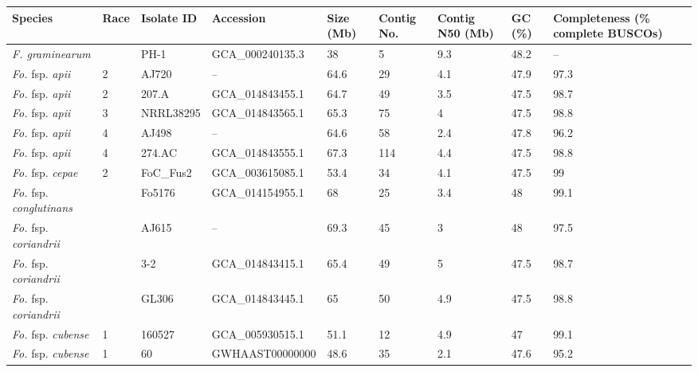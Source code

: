 \begin{ThreePartTable}
\begin{longtable}[c]{@{}C{2.5cm}C{0.8cm}C{2cm}C{2.8cm}C{1cm}C{1cm}C{1.5cm}C{0.7cm}C{2.5cm}@{}}
\label{tab:GenomeDB}\\
\toprule
\textbf{Species} & \textbf{Race} & \textbf{Isolate ID} & \textbf{Accession} & \textbf{Size (Mb)} & \textbf{Contig No.} & \textbf{Contig N50 (Mb)} & \textbf{GC (\%)} & \textbf{Completeness (\% complete BUSCOs)} \\* \midrule
\endhead
%
\bottomrule
\endfoot
%
\endlastfoot
%
\textit{F. graminearum}        &     & PH-1         & GCA\_000240135.3 & 38   & 5     & 9.3  & 48.2 &--    \\
\textit{Fo.} fsp. \textit{apii}         & 2   & AJ720        &--             & 64.6 & 29    & 4.1  & 47.9 & 97.3 \\
\textit{Fo.} fsp. \textit{apii}         & 2   & 207.A        & GCA\_014843455.1 & 64.7 & 49    & 3.5  & 47.5 & 98.7 \\
\textit{Fo.} fsp. \textit{apii}         & 3   & NRRL38295    & GCA\_014843565.1 & 65.3 & 75    & 4    & 47.5 & 98.8 \\
\textit{Fo.} fsp. \textit{apii}         & 4   & AJ498        & --             & 64.6 & 58    & 2.4  & 47.8 & 96.2 \\
\textit{Fo.} fsp. \textit{apii}         & 4   & 274.AC       & GCA\_014843555.1 & 67.3 & 114   & 4.4  & 47.5 & 98.8 \\
\textit{Fo.} fsp. \textit{cepae}        & 2   & FoC\_Fus2    & GCA\_003615085.1 & 53.4 & 34    & 4.1  & 47.5 & 99   \\
\textit{Fo.} fsp. \textit{conglutinans} &     & Fo5176       & GCA\_014154955.1 & 68   & 25    & 3.4  & 48   & 99.1 \\
\textit{Fo.} fsp. \textit{coriandrii}   &     & AJ615        &--             & 69.3 & 45    & 3    & 48   & 97.5 \\
\textit{Fo.} fsp. \textit{coriandrii}   &     & 3-2          & GCA\_014843415.1 & 65.4 & 49    & 5    & 47.5 & 98.7 \\
\textit{Fo.} fsp. \textit{coriandrii}   &     & GL306        & GCA\_014843445.1 & 65   & 50    & 4.9  & 47.5 & 98.8 \\
\textit{Fo.} fsp. \textit{cubense}      & 1   & 160527       & GCA\_005930515.1 & 51.1 & 12    & 4.9  & 47   & 99.1 \\
\textit{Fo.} fsp. \textit{cubense}      & 1   & 60           & GWHAAST00000000  & 48.6 & 35    & 2.1  & 47.6 & 95.2 \\

\end{longtable}
\end{ThreePartTable}
